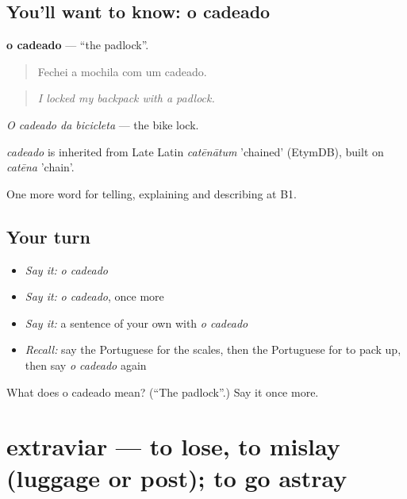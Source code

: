 \subsection*{You'll want to know: o cadeado}
\textbf{o cadeado} — \textquotedblleft{}the padlock\textquotedblright{}.

\begin{quote}
Fechei a mochila com um cadeado.
\end{quote}

\begin{quote}
\emph{I locked my backpack with a padlock.}
\end{quote}

\emph{O cadeado da bicicleta} — the bike lock.

\begin{cousinweb}
\emph{cadeado} is inherited from Late Latin \emph{catēnātum} 'chained' (EtymDB), built on \emph{catēna} 'chain'.
\end{cousinweb}

\begin{grammarlens}[title={What you've built}]
One more word for telling, explaining and describing at B1.
\end{grammarlens}

\subsection*{Your turn}
\begin{itemize}
\raggedright
  \item \emph{Say it:} \emph{o cadeado}
  \item \emph{Say it:} \emph{o cadeado}, once more
  \item \emph{Say it:} a sentence of your own with \emph{o cadeado}
  \item \emph{Recall:} say the Portuguese for the scales, then the Portuguese for to pack up, then say \emph{o cadeado} again
\end{itemize}

\begin{tcolorbox}[breakable,colback=teal!4,colframe=teal!35!black,title={Before you move on}]
What does o cadeado mean? (\textquotedblleft{}The padlock\textquotedblright{}.) Say it once more.
\end{tcolorbox}
\section[extraviar]{extraviar — to lose, to mislay (luggage or post); to go astray}

